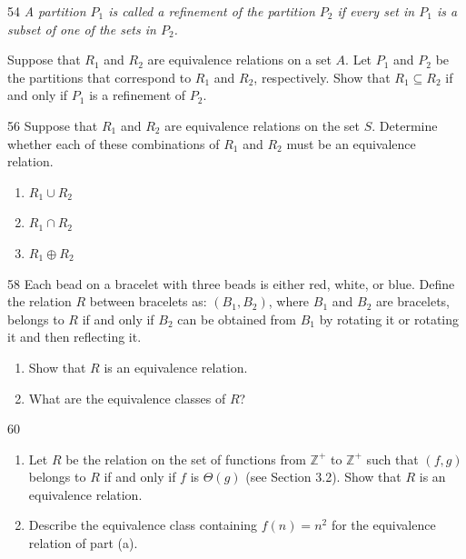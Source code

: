 \documentclass[11pt]{article}
\begin{document}
\begin{exercise}{54}
    \textit{A partition $P_1$ is called a \emph{refinement} of the
    partition $P_2$ if every set in $P_1$ is a subset of one of the
    sets in $P_2$.}

    Suppose that $R_1$ and $R_2$ are equivalence relations on a set
    $A$. Let $P_1$ and $P_2$ be the partitions that correspond to
    $R_1$ and $R_2$, respectively. Show that $R_1 \subseteq R_2$ if
    and only if $P_1$ is a refinement of $P_2$.
\end{exercise}

\begin{exercise}{56}
    Suppose that $R_1$ and $R_2$ are equivalence relations on the set
    $S$. Determine whether each of these combinations of $R_1$ and
    $R_2$ must be an equivalence relation.
    \begin{enumerate}[label=(\alph*)]
        \item $R_1 \cup R_2$
        \item $R_1 \cap R_2$
        \item $R_1 \oplus R_2$
    \end{enumerate}
\end{exercise}

\begin{exercise}{58}
    Each bead on a bracelet with three beads is either red, white, or
    blue. Define the relation $R$ between bracelets as: $(B_1, B_2)$,
    where $B_1$ and $B_2$ are bracelets, belongs to $R$ if and only if
    $B_2$ can be obtained from $B_1$ by rotating it or rotating it and
    then reflecting it.
    \begin{enumerate}[label=(\alph*)]
        \item Show that $R$ is an equivalence relation.
        \item What are the equivalence classes of $R$?
    \end{enumerate}
\end{exercise}

\begin{exercise}{60}
    \begin{enumerate}[label=(\alph*)]
        \item Let $R$ be the relation on the set of functions from
        $\mathbb{Z}^+$ to $\mathbb{Z}^+$ such that $(f,g)$ belongs to
        $R$ if and only if $f$ is $\Theta(g)$ (see Section 3.2). Show
        that $R$ is an equivalence relation.
        \item Describe the equivalence class containing $f(n) = n^2$
        for the equivalence relation of part (a).
    \end{enumerate}
\end{exercise}
\end{document}
